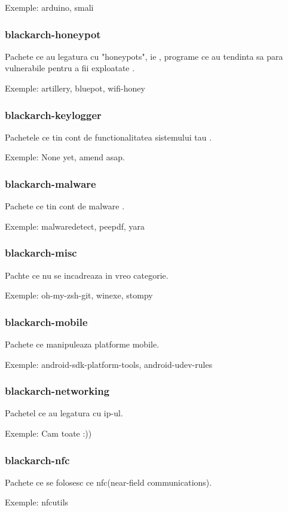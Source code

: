 \documentclass[a4paper, oneside, 11pt]{book}
\begin{document}
Exemple: arduino, smali

\subsubsection{blackarch-honeypot}
Pachete ce au legatura cu "honeypots", ie , programe ce au tendinta sa para vulnerabile pentru a fii exploatate .

Exemple: artillery, bluepot, wifi-honey

\subsubsection{blackarch-keylogger}
Pachetele ce tin cont de functionalitatea sistemului tau .

Exemple: None yet, amend asap.

\subsubsection{blackarch-malware}
Pachete ce tin cont de malware .

Exemple: malwaredetect, peepdf, yara

\subsubsection{blackarch-misc}
Pachte ce nu se incadreaza in vreo categorie.

Exemple: oh-my-zsh-git, winexe, stompy

\subsubsection{blackarch-mobile}
Pachete ce manipuleaza platforme mobile.

Exemple: android-sdk-platform-tools, android-udev-rules

\subsubsection{blackarch-networking}
Pachetel ce au legatura cu ip-ul.

Exemple: Cam toate :))

\subsubsection{blackarch-nfc}
Pachete  ce se folosesc ce nfc(near-field communications).

Exemple: nfcutils
\end{document}
